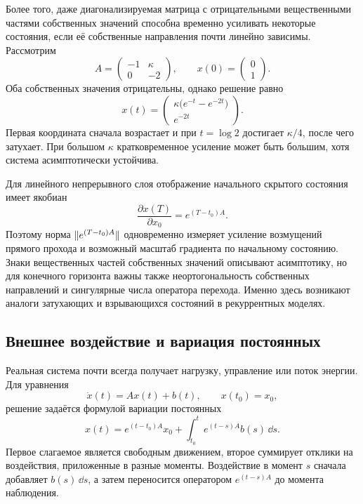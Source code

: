 Более того, даже диагонализируемая матрица с отрицательными вещественными частями собственных значений способна временно усиливать некоторые состояния, если её собственные направления почти линейно зависимы. Рассмотрим
\begin{equation}
\label{eq:nonnormal-transient-example-v02}
A=
\begin{pmatrix}
-1&\kappa\\
0&-2
\end{pmatrix},
\qquad
x(0)=
\begin{pmatrix}
0\\1
\end{pmatrix}.
\end{equation}
Оба собственных значения отрицательны, однако решение равно
\begin{equation}
\label{eq:nonnormal-transient-solution-v02}
x(t)=
\begin{pmatrix}
\kappa\bigl(e^{-t}-e^{-2t}\bigr)\\
e^{-2t}
\end{pmatrix}.
\end{equation}
Первая координата сначала возрастает и при $t=\log2$ достигает $\kappa/4$, после чего затухает. При большом $\kappa$ кратковременное усиление может быть большим, хотя система асимптотически устойчива.

\begin{mlconnection}
Для линейного непрерывного слоя отображение начального скрытого состояния имеет якобиан
\begin{equation}
\label{eq:linear-flow-input-jacobian-v02}
\frac{\partial x(T)}{\partial x_0}=e^{(T-t_0)A}.
\end{equation}
Поэтому норма $\lVert e^{(T-t_0)A}\rVert$ одновременно измеряет усиление возмущений прямого прохода и возможный масштаб градиента по начальному состоянию. Знаки вещественных частей собственных значений описывают асимптотику, но для конечного горизонта важны также неортогональность собственных направлений и сингулярные числа оператора перехода. Именно здесь возникают аналоги затухающих и взрывающихся состояний в рекуррентных моделях.
\end{mlconnection}

\subsection{Внешнее воздействие и вариация постоянных}

Реальная система почти всегда получает нагрузку, управление или поток энергии. Для уравнения
\begin{equation}
\label{eq:forced-linear-system-v02}
\dot x(t)=Ax(t)+b(t),
\qquad
x(t_0)=x_0,
\end{equation}
решение задаётся формулой вариации постоянных
\begin{equation}
\label{eq:variation-of-constants-v02}
x(t)
=
e^{(t-t_0)A}x_0
+
\int_{t_0}^{t}e^{(t-s)A}b(s)\,\dd s.
\end{equation}
Первое слагаемое является свободным движением, второе суммирует отклики на воздействия, приложенные в разные моменты. Воздействие в момент $s$ сначала добавляет $b(s)\,\dd s$, а затем переносится оператором $e^{(t-s)A}$ до момента наблюдения.

